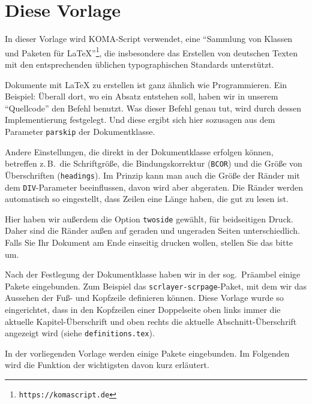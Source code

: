 \section{Diese Vorlage}
\label{sec:template}
In dieser Vorlage wird KOMA-Script verwendet, eine \enquote{Sammlung von Klassen und Paketen für \LaTeX{}}\footnote{\texttt{https://komascript.de}}, die insbesondere das Erstellen von deutschen Texten mit den entsprechenden üblichen typographischen Standards unterstützt.
\par
Dokumente mit \LaTeX{} zu erstellen ist ganz ähnlich wie Programmieren. Ein Beispiel: Überall dort, wo ein Absatz entstehen soll, haben wir in unserem \enquote{Quellcode} den Befehl  benutzt. Was dieser Befehl genau tut, wird durch dessen Implementierung festgelegt. Und diese ergibt sich hier sozusagen aus dem Parameter \texttt{parskip} der Dokumentklasse.
\par
Andere Einstellungen, die direkt in der Dokumentklasse erfolgen können, betreffen z.\,B.\ die Schriftgröße, die Bindungskorrektur (\texttt{BCOR}) und die Größe von Überschriften (\texttt{headings}). Im Prinzip kann man auch die Größe der Ränder mit dem \texttt{DIV}-Parameter beeinflussen, davon wird aber abgeraten. Die Ränder werden automatisch so eingestellt, dass Zeilen eine Länge haben, die gut zu lesen ist.
\par
Hier haben wir außerdem die Option \texttt{twoside} gewählt, für beidseitigen Druck. Daher sind die Ränder außen auf geraden und ungeraden Seiten unterschiedlich. Falls Sie Ihr Dokument am Ende einseitig drucken wollen, stellen Sie das bitte um.
\par
Nach der Festlegung der Dokumentklasse haben wir in der sog.\ Präambel einige Pakete eingebunden. Zum Beispiel das \texttt{scrlayer-scrpage}-Paket, mit dem wir das Aussehen der Fuß- und Kopfzeile definieren können. Diese Vorlage wurde so eingerichtet, dass in den Kopfzeilen einer Doppelseite oben links immer die aktuelle Kapitel-Überschrift und oben rechts die aktuelle Abschnitt-Überschrift angezeigt wird (siehe \texttt{definitions.tex}).
\par
In der vorliegenden Vorlage werden einige Pakete eingebunden. Im Folgenden wird die Funktion der wichtigsten davon kurz erläutert.
%
